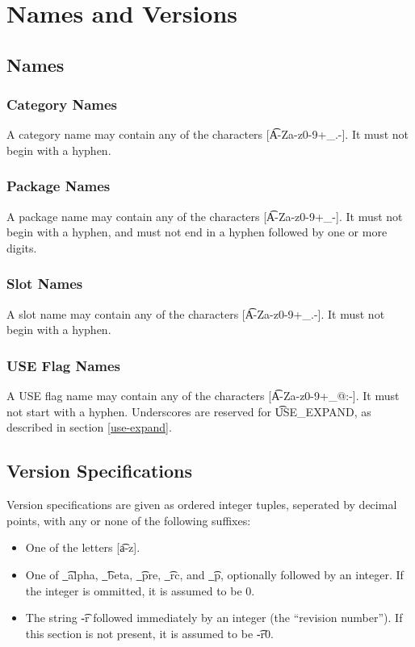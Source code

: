 \chapter{Names and Versions}

\section{Names}
\subsection{Category Names}
A category name may contain any of the characters [\t{A-Za-z0-9+\_.-}]. It must not begin with
a hyphen.

\subsection{Package Names}
A package name may contain any of the characters [\t{A-Za-z0-9+\_-}]. It must not begin with a
hyphen, and must not end in a hyphen followed by one or more digits.

\subsection{Slot Names}
A slot name may contain any of the characters [\t{A-Za-z0-9+\_.-}]. It must not begin with a
hyphen.

\subsection{USE Flag Names}
A USE flag name may contain any of the characters [\t{A-Za-z0-9+\_@:-}]. It must not start with
a hyphen. Underscores are reserved for \t{USE\_EXPAND}, as described in section
\ref{use-expand}.

\section{Version Specifications}
Version specifications are given as ordered integer tuples, seperated by decimal points, with any or
none of the following suffixes:
\begin{itemize}
\item One of the letters [\t{a-z}].
\item One of \t{\_alpha}, \t{\_beta}, \t{\_pre}, \t{\_rc}, and \t{\_p}, optionally followed by an
    integer. If the integer is ommitted, it is assumed to be 0.
\item The string \t{-r} followed immediately by an integer (the ``revision number''). If this section
    is not present, it is assumed to be \t{-r0}.
\end{itemize}

